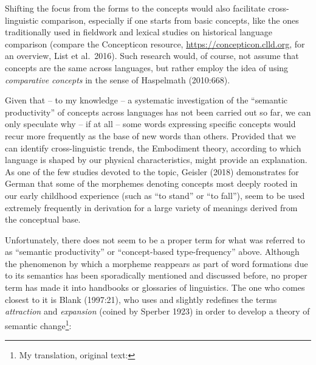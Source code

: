 \documentclass[
  english,
  a4paper,
  oneside,tablecaptionabove
]{scrbook}
\begin{document}
Shifting the focus from the forms to the concepts would also facilitate
cross-linguistic comparison, especially if one starts from basic
concepts, like the ones traditionally used in fieldwork and lexical
studies on historical language comparison (compare the Concepticon
resource,
\href{https://concepticon.clld.org/}{https://concepticon.clld.org}, for
an overview, List et al.~2016). Such research would, of course, not
assume that concepts are the same across languages, but rather employ
the idea of using \emph{comparative concepts} in the sense of Haspelmath
(2010:668).

Given that -- to my knowledge -- a systematic investigation of the
\enquote{semantic productivity} of concepts across languages has not
been carried out so far, we can only speculate why -- if at all -- some
words expressing specific concepts would recur more frequently as the
base of new words than others. Provided that we can identify
cross-linguistic trends, the Embodiment theory, according to which
language is shaped by our physical characteristics, might provide an
explanation. As one of the few studies devoted to the topic, Geisler
(2018) demonstrates for German that some of the morphemes denoting
concepts most deeply rooted in our early childhood experience (such as
\enquote{to stand} or \enquote{to fall}), seem to be used extremely
frequently in derivation for a large variety of meanings derived from
the conceptual base.

Unfortunately, there does not seem to be a proper term for what was
referred to as \enquote{semantic productivity} or \enquote{concept-based
type-frequency} above. Although the phenomenon by which a morpheme
reappears as part of word formations due to its semantics has been
sporadically mentioned and discussed before, no proper term has made it
into handbooks or glossaries of linguistics. The one who comes closest
to it is Blank (1997:21), who uses and slightly redefines the terms
\emph{attraction} and \emph{expansion} (coined by Sperber 1923) in order
to develop a theory of semantic change\footnote{My translation, original text: }:
\end{document}
